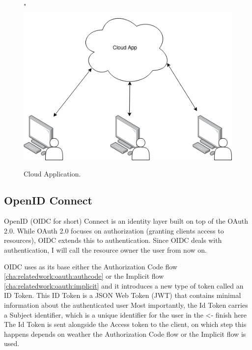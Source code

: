 \begin{figure}[H]
    \centering"
    \includegraphics[scale=0.4]{images/basic-cloud-services.drawio.png}
    \caption{Cloud Application.}
    \label{fig:oauth:authcodeflow}
\end{figure}

\subsection{OpenID Connect}
\label{cha:relatedwork:oauth:openid}


OpenID (OIDC for short) Connect is an identity layer built on top of the OAuth 2.0.
While OAuth 2.0 focuses on authorization (granting clients access to resources),
OIDC extends this to authentication.
Since OIDC deals with authentication, I will call the resource owner the user from now on.

OIDC uses as its base either the Authorization Code flow
\ref{cha:relatedwork:oauth:authcode} or the Implicit flow
\ref{cha:relatedwork:oauth:implicit} and
it introduces a new type of token called an ID Token.
This ID Token is a JSON Web Token (JWT) that contains minimal information about the authenticated
user
Most importantly, the Id Token carries a Subject identifier, which is a unique identifier
for the user in the <- finish here 
The Id Token is sent alongside the Access token to the client, on which step this happens
depends on weather the Authorization Code flow or the Implicit flow is used.


